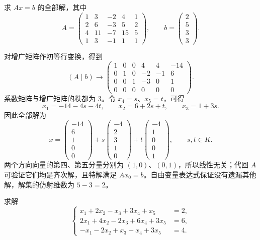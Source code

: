 \begin{example}
\label{ex:linear-system-general-solution}
求 $Ax=b$ 的全部解，其中
\[
    A=\begin{pmatrix}
        1&3&-2&4&1\\
        2&6&-3&5&2\\
        4&11&-7&15&5\\
        1&3&-1&1&1
    \end{pmatrix},\qquad b=\begin{pmatrix}2\\5\\3\\3\end{pmatrix}.
\]
\end{example}

\begin{solve}
对增广矩阵作初等行变换，得到
\[
    (A\mid b)\longrightarrow
    \left(\begin{array}{ccccc|c}
        1&0&0&4&4&-14\\
        0&1&0&-2&-1&6\\
        0&0&1&-3&0&1\\
        0&0&0&0&0&0
    \end{array}\right).
\]
系数矩阵与增广矩阵的秩都为 $3$。令 $x_4=s$、$x_5=t$，可得
\[
    x_1=-14-4s-4t,\qquad x_2=6+2s+t,\qquad x_3=1+3s.
\]
因此全部解为
\[
    x=\begin{pmatrix}-14\\6\\1\\0\\0\end{pmatrix}
      +s\begin{pmatrix}-4\\2\\3\\1\\0\end{pmatrix}
      +t\begin{pmatrix}-4\\1\\0\\0\\1\end{pmatrix},\qquad s,t\in K.
\]
两个方向向量的第四、第五分量分别为 $(1,0)$、$(0,1)$，所以线性无关；代回 $A$ 可验证它们均是齐次解，且特解满足 $Ax_0=b$。自由变量表达式保证没有遗漏其他解，解集的仿射维数为 $5-3=2$。
\end{solve}

\begin{example}
\label{ex:linear-system-variable-permutation}
求解
\[
    \left\{\begin{aligned}
        x_1+2x_2-x_3+3x_4+x_5&=2,\\
        2x_1+4x_2-2x_3+6x_4+3x_5&=6,\\
        -x_1-2x_2+x_3-x_4+3x_5&=4.
    \end{aligned}\right.
\]
\end{example}

